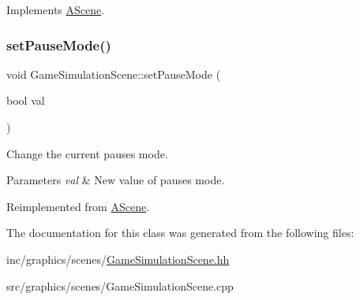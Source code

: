 Implements \hyperlink{classAScene_af521e5e6d30a5d2e5d30eb333e4d3abd}{A\+Scene}.

\mbox{\label{classGameSimulationScene_a34377bab69b7a81e50f3d2c42596c574}} 
\subsubsection{\texorpdfstring{set\+Pause\+Mode()}{setPauseMode()}}
{\footnotesize\ttfamily void Game\+Simulation\+Scene\+::set\+Pause\+Mode (\begin{DoxyParamCaption}\item[{bool}]{val }\end{DoxyParamCaption})\hspace{0.3cm}{\ttfamily [virtual]}}



Change the current pause\textquotesingle{}s mode. 


\begin{DoxyParams}{Parameters}
{\em val} & New value of pause\textquotesingle{}s mode. \\
\hline
\end{DoxyParams}


Reimplemented from \hyperlink{classAScene_a7ff45d7a24796f52d815c00770900339}{A\+Scene}.



The documentation for this class was generated from the following files\+:\begin{DoxyCompactItemize}
\item 
inc/graphics/scenes/\hyperlink{GameSimulationScene_8hh}{Game\+Simulation\+Scene.\+hh}\item 
src/graphics/scenes/Game\+Simulation\+Scene.\+cpp\end{DoxyCompactItemize}
